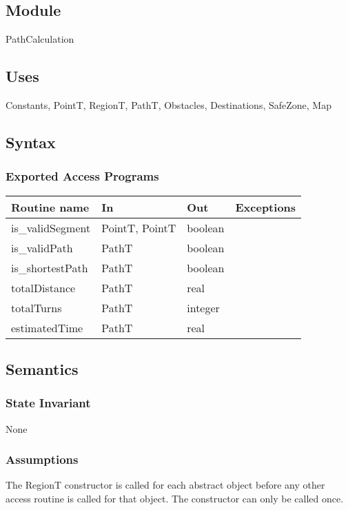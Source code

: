 \documentclass[12pt]{article}
\begin{document}
\subsection* {Module}

PathCalculation

\subsection* {Uses}

Constants, PointT, RegionT, PathT, Obstacles, Destinations, SafeZone, Map

\subsection* {Syntax}

\subsubsection* {Exported Access Programs}

\begin{tabular}{| l | l | l | l |}
\hline
\textbf{Routine name} & \textbf{In} & \textbf{Out} & \textbf{Exceptions}\\
\hline
is\_validSegment & PointT, PointT & boolean & ~\\
\hline
is\_validPath & PathT & boolean & ~\\
\hline
is\_shortestPath & PathT & boolean & ~\\
\hline
totalDistance & PathT & real & ~\\
\hline
totalTurns & PathT & integer & ~\\
\hline
estimatedTime & PathT & real & ~\\
\hline

\end{tabular}

\subsection* {Semantics}

\subsubsection* {State Invariant}
None

\subsubsection* {Assumptions}
The RegionT constructor is called for each abstract object before any other access routine is called for that
object.  The constructor can only be called once.
\end{document}
